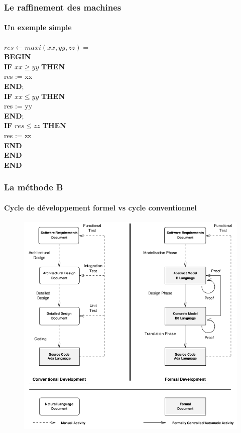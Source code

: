 \documentclass[11pt,a4paper,xcolor=table, handout]{beamer} %
\begin{document}
\begin{frame}
\frametitle{Le raffinement des machines}
\framesubtitle{Un exemple simple}
$res \leftarrow maxi ( xx , yy , zz ) = $ \\
\hspace*{1em}    \textbf{BEGIN} \\
\hspace*{1em}    \textbf{IF} $xx \geq yy$ \textbf{THEN} \\
\hspace*{2em}        res := xx \\
\hspace*{1em}    \textbf{END}; \\
\hspace*{1em}   \textbf{IF} $xx \leq yy$  \textbf{THEN} \\
\hspace*{2em}        res := yy \\
\hspace*{1em}    \textbf{END}; \\
\hspace*{1em}   \textbf{IF} $res \leq zz$ \textbf{THEN} \\
\hspace*{2em}        res := zz \\
\hspace*{1em}    \textbf{END} \\
\hspace*{1em}    \textbf{END} \\
\textbf{END}
\end{frame}

\begin{frame}
\frametitle{La méthode B}
\framesubtitle{Cycle de développement formel vs cycle conventionnel}
\begin{figure}[h]
\centering
\includegraphics[scale=0.33]{ressources/formal_dev.png}
\end{figure}
\end{frame}
\end{document}
